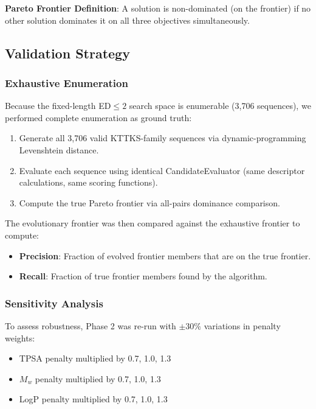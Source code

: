 \documentclass[11pt,letterpaper]{article}
\begin{document}
\textbf{Pareto Frontier Definition}: A solution is non-dominated (on the frontier) if no other solution dominates it on all three objectives simultaneously.

\subsection{Validation Strategy}

\subsubsection{Exhaustive Enumeration}

Because the fixed-length ED$\leq 2$ search space is enumerable (3,706 sequences), we performed complete enumeration as ground truth:
\begin{enumerate}
  \item Generate all 3,706 valid KTTKS-family sequences via dynamic-programming Levenshtein distance.
  \item Evaluate each sequence using identical CandidateEvaluator (same descriptor calculations, same scoring functions).
  \item Compute the true Pareto frontier via all-pairs dominance comparison.
\end{enumerate}

The evolutionary frontier was then compared against the exhaustive frontier to compute:
\begin{itemize}
  \item \textbf{Precision}: Fraction of evolved frontier members that are on the true frontier.
  \item \textbf{Recall}: Fraction of true frontier members found by the algorithm.
\end{itemize}

\subsubsection{Sensitivity Analysis}

To assess robustness, Phase 2 was re-run with $\pm 30\%$ variations in penalty weights:
\begin{itemize}
  \item TPSA penalty multiplied by 0.7, 1.0, 1.3
  \item $M_w$ penalty multiplied by 0.7, 1.0, 1.3
  \item LogP penalty multiplied by 0.7, 1.0, 1.3
\end{itemize}
\end{document}
